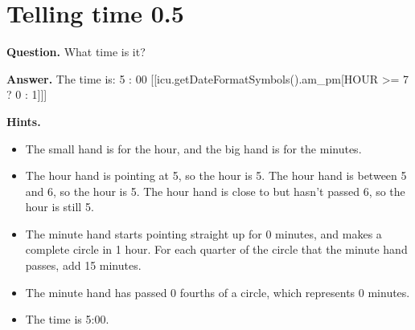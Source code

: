 \documentclass{article}
\begin{document}
\section*{Telling time 0.5}
\textbf{Question.} What time is it?

\textbf{Answer.} The time is: 5 : 00 [[icu.getDateFormatSymbols().am\_pm[HOUR >= 7 ? 0 : 1]]]

\textbf{Hints.}
\begin{itemize}
  \item The small hand is for the hour, and the big hand is for the minutes.
  \item The hour hand is pointing at 5, so the hour is 5.
                    The hour hand is between 5 and 6, so the hour is 5.
                    The hour hand is close to but hasn't passed 6, so the hour is still 5.
  \item The minute hand starts pointing straight up for 0 minutes, and makes a complete circle in 1 hour.
                    For each quarter of the circle that the minute hand passes, add 15 minutes.
  \item The minute hand has passed 0 fourths of a circle, which represents 0 minutes.
  \item The time is 5:00.
\end{itemize}
\end{document}
